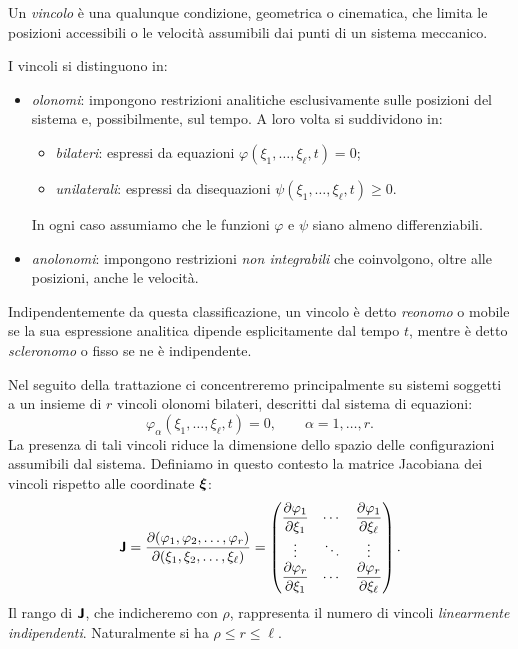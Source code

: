 \begin{definition}[Vincolo]
Un \emph{vincolo} è una qualunque condizione, geometrica o cinematica, che limita le posizioni accessibili o le velocità assumibili dai punti di un sistema meccanico.

I vincoli si distinguono in:
\begin{itemize}
    \item \emph{olonomi}: impongono restrizioni analitiche esclusivamente sulle posizioni del sistema e, possibilmente, sul tempo. A loro volta si suddividono in:
    \begin{itemize}
        \item \emph{bilateri}: espressi da equazioni $\varphi(\xi_1, \dots, \xi_\ell, t) = 0$;
        \item \emph{unilaterali}: espressi da disequazioni $\psi(\xi_1, \dots, \xi_\ell, t) \geq 0$.
    \end{itemize}
    In ogni caso assumiamo che le funzioni $\varphi$ e $\psi$ siano almeno differenziabili.
    \item \emph{anolonomi}: impongono restrizioni \emph{non integrabili} che coinvolgono, oltre alle posizioni, anche le velocità.
\end{itemize}

Indipendentemente da questa classificazione, un vincolo è detto \emph{reonomo} o mobile se la sua espressione analitica dipende esplicitamente dal tempo $t$, mentre è detto \emph{scleronomo} o fisso se ne è indipendente.
\end{definition}

Nel seguito della trattazione ci concentreremo principalmente su sistemi soggetti a un insieme di $r$ vincoli olonomi bilateri, descritti dal sistema di equazioni:
\begin{equation*}
    \varphi_\alpha(\xi_1, \dots, \xi_\ell, t) = 0, \qquad \alpha = 1, \dots, r.
\end{equation*}
La presenza di tali vincoli riduce la dimensione dello spazio delle configurazioni assumibili dal sistema. Definiamo in questo contesto la matrice Jacobiana dei vincoli rispetto alle coordinate $\vb*{\xi}$:
\begin{equation*}
    \boldsymbol{\mathsf{J}} = \frac{\partial(\varphi_1, \varphi_2, \dots, \varphi_r)}{\partial(\xi_1, \xi_2, \dots, \xi_\ell)} = 
    \begin{pmatrix}
        \displaystyle \pdv{\varphi_1}{\xi_1} & \cdots & \displaystyle \pdv{\varphi_1}{\xi_\ell} \\[0.7em]
        \vdots & \ddots & \vdots \\
        \displaystyle \pdv{\varphi_r}{\xi_1} & \cdots & \displaystyle \pdv{\varphi_r}{\xi_\ell}
    \end{pmatrix}.
\end{equation*}
Il rango di $\boldsymbol{\mathsf{J}}$, che indicheremo con $\rho$, rappresenta il numero di vincoli \emph{linearmente indipendenti}. Naturalmente si ha $\rho \leq r \leq \ell$. 

